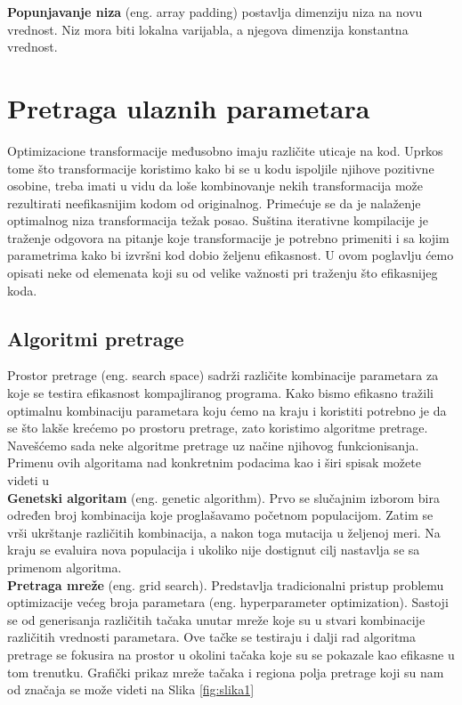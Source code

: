 \documentclass[a4paper]{article}
\begin{document}
\textbf{Popunjavanje niza} (eng. array padding) postavlja dimenziju niza na novu vrednost. Niz mora biti lokalna varijabla, a njegova dimenzija konstantna vrednost.

\section{Pretraga ulaznih parametara}
\label{sec:pretraga}
Optimizacione transformacije međusobno imaju različite uticaje na kod. Uprkos tome što transformacije koristimo kako bi se u kodu ispoljile njihove pozitivne osobine, treba imati u vidu da loše kombinovanje nekih transformacija može rezultirati neefikasnijim kodom od originalnog. \cite{kisuki2000iterative} Primećuje se da je
nalaženje optimalnog niza transformacija težak posao. \cite{Fursin2005} Suština iterativne kompilacije
je traženje odgovora na pitanje koje transformacije je potrebno primeniti i sa kojim parametrima kako bi izvršni kod dobio željenu efikasnost. U ovom poglavlju ćemo opisati neke od elemenata koji su od velike važnosti pri traženju što efikasnijeg koda.
\subsection{Algoritmi pretrage}
\label{sec:pretrage}

Prostor pretrage (eng. search space) sadrži različite kombinacije parametara za koje se testira efikasnost kompajliranog programa. Kako bismo efikasno tražili optimalnu kombinaciju parametara koju ćemo na kraju i koristiti potrebno je da se što lakše krećemo po prostoru pretrage, zato koristimo algoritme pretrage. Navešćemo sada neke algoritme pretrage uz načine njihovog funkcionisanja. Primenu ovih algoritama nad konkretnim podacima kao i širi spisak možete videti u \cite{kisuki2000iterative} \\

\textbf{Genetski algoritam} (eng. genetic algorithm). Prvo se slučajnim izborom bira određen broj kombinacija koje proglašavamo početnom populacijom. Zatim se vrši ukrštanje različitih kombinacija, a nakon toga mutacija u željenoj meri. Na kraju se evaluira nova populacija i ukoliko nije dostignut cilj nastavlja se sa primenom algoritma.\\

\textbf{Pretraga mreže} (eng. grid search). Predstavlja tradicionalni pristup problemu optimizacije većeg broja parametara (eng. hyperparameter optimization). Sastoji se od generisanja različitih tačaka unutar mreže koje su u stvari kombinacije različitih vrednosti parametara. Ove tačke se testiraju i dalji rad algoritma pretrage se fokusira na prostor u okolini tačaka koje su se pokazale kao efikasne u tom trenutku. Grafički prikaz mreže tačaka i regiona polja pretrage koji su nam od značaja se može videti na Slika \ref{fig:slika1} \\
\end{document}
